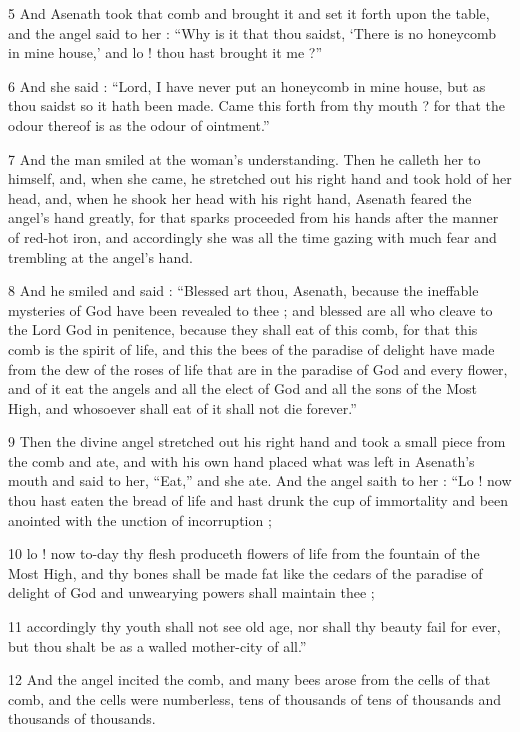 5 And Asenath took that comb and brought it and set it forth upon the table, and the angel said to her : “Why is it that thou saidst, ‘There is no honeycomb in mine house,’ and lo ! thou hast brought it me ?” 

6 And she said : “Lord, I have never put an honeycomb in mine house, but as thou saidst so it hath been made. Came this forth from thy mouth ? for that the odour thereof is as the odour of ointment.” 

7 And the man smiled at the woman's understanding. Then he calleth her to himself, and, when she came, he stretched out his right hand and took hold of her head, and, when he shook her head with his right hand, Asenath feared the angel's hand greatly, for that sparks proceeded from his hands after the manner of red-hot iron, and accordingly she was all the time gazing with much fear and trembling at the angel's hand. 

8 And he smiled and said : “Blessed art thou, Asenath, because the ineffable mysteries of God have been revealed to thee ; and blessed are all who cleave to the Lord God in penitence, because they shall eat of this comb, for that this comb is the spirit of life, and this the bees of the paradise of delight have made from the dew of the roses of life that are in the paradise of God and every flower, and of it eat the angels and all the elect of God and all the sons of the Most High, and whosoever shall eat of it shall not die forever.” 

9 Then the divine angel stretched out his right hand and took a small piece from the comb and ate, and with his own hand placed what was left in Asenath's mouth and said to her, “Eat,” and she ate. And the angel saith to her : “Lo ! now thou hast eaten the bread of life and hast drunk the cup of immortality and been anointed with the unction of incorruption ; 

10 lo ! now to-day thy flesh produceth flowers of life from the fountain of the Most High, and thy bones shall be made fat like the cedars of the paradise of delight of God and unwearying powers shall maintain thee ; 

11 accordingly thy youth shall not see old age, nor shall thy beauty fail for ever, but thou shalt be as a walled mother-city of all.” 

12 And the angel incited the comb, and many bees arose from the cells of that comb, and the cells were numberless, tens of thousands of tens of thousands and thousands of thousands. 

